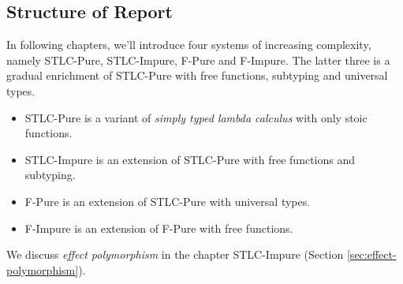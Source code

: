 \subsection{Structure of Report}

In following chapters, we'll introduce four systems of increasing
complexity, namely STLC-Pure, STLC-Impure, F-Pure and F-Impure. The
latter three is a gradual enrichment of STLC-Pure with free functions,
subtyping and universal types.

\begin{itemize}
\item STLC-Pure is a variant of \emph{simply typed lambda calculus}
  with only stoic functions.
\item STLC-Impure is an extension of STLC-Pure with free functions and subtyping.
\item F-Pure is an extension of STLC-Pure with universal types.
\item F-Impure is an extension of F-Pure with free functions.
\end{itemize}

We discuss \emph{effect polymorphism} in the chapter STLC-Impure
(Section \ref{sec:effect-polymorphism}).

